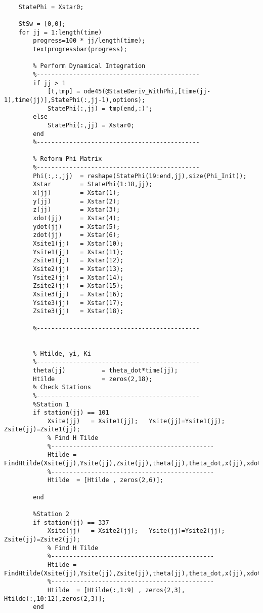 \documentclass[12pt,a4paper,oneside]{article}
\numberwithin{equation}{section}   		%
\begin{document}
\begin{appendices}
\begin{lstlisting}
    
    StatePhi = Xstar0;

    StSw = [0,0];
    for jj = 1:length(time)
        progress=100 * jj/length(time);
        textprogressbar(progress);
        
        % Perform Dynamical Integration
        %---------------------------------------------
        if jj > 1
            [t,tmp] = ode45(@StateDeriv_WithPhi,[time(jj-1),time(jj)],StatePhi(:,jj-1),options);
            StatePhi(:,jj) = tmp(end,:)';
        else
            StatePhi(:,jj) = Xstar0;
        end
        %---------------------------------------------
           
        % Reform Phi Matrix
        %---------------------------------------------   
        Phi(:,:,jj)  = reshape(StatePhi(19:end,jj),size(Phi_Init));
        Xstar        = StatePhi(1:18,jj);
        x(jj)        = Xstar(1);
        y(jj)        = Xstar(2);
        z(jj)        = Xstar(3);
        xdot(jj)     = Xstar(4);
        ydot(jj)     = Xstar(5);
        zdot(jj)     = Xstar(6);
        Xsite1(jj)   = Xstar(10);
        Ysite1(jj)   = Xstar(11);
        Zsite1(jj)   = Xstar(12);
        Xsite2(jj)   = Xstar(13);
        Ysite2(jj)   = Xstar(14);
        Zsite2(jj)   = Xstar(15);
        Xsite3(jj)   = Xstar(16);
        Ysite3(jj)   = Xstar(17);
        Zsite3(jj)   = Xstar(18);
        
        %---------------------------------------------
    
    
        % Htilde, yi, Ki
        %---------------------------------------------
        theta(jj)          = theta_dot*time(jj);
        Htilde             = zeros(2,18);
        % Check Stations
        %---------------------------------------------
        %Station 1
        if station(jj) == 101
            Xsite(jj)   = Xsite1(jj);   Ysite(jj)=Ysite1(jj);   Zsite(jj)=Zsite1(jj);
            % Find H Tilde
            %---------------------------------------------
            Htilde = FindHtilde(Xsite(jj),Ysite(jj),Zsite(jj),theta(jj),theta_dot,x(jj),xdot(jj),y(jj),ydot(jj),z(jj),zdot(jj));
            %---------------------------------------------
            Htilde  = [Htilde , zeros(2,6)];
            
        end

        %Station 2
        if station(jj) == 337
            Xsite(jj)   = Xsite2(jj);   Ysite(jj)=Ysite2(jj);   Zsite(jj)=Zsite2(jj);
            % Find H Tilde
            %---------------------------------------------
            Htilde = FindHtilde(Xsite(jj),Ysite(jj),Zsite(jj),theta(jj),theta_dot,x(jj),xdot(jj),y(jj),ydot(jj),z(jj),zdot(jj));
            %---------------------------------------------
            Htilde  = [Htilde(:,1:9) , zeros(2,3), Htilde(:,10:12),zeros(2,3)];
        end


\end{lstlisting}
\end{appendices}
\end{document}

